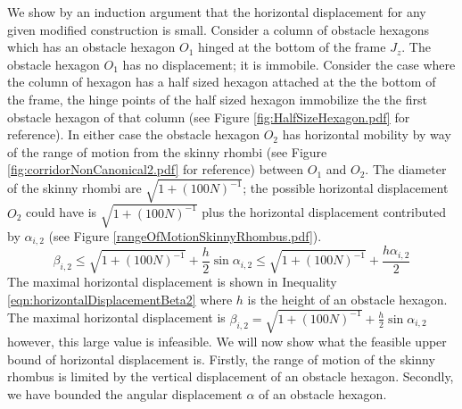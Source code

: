 We show by an induction argument that the horizontal displacement for any given modified construction is small.  
Consider a column of obstacle hexagons which has an obstacle hexagon $O_1$ hinged at the bottom of the frame $J_z$.  
The obstacle hexagon $O_1$ has no displacement; it is immobile.  
Consider the case where the column of hexagon has a half sized hexagon attached at the the bottom of the frame, the hinge points of the half sized hexagon immobilize the the first obstacle hexagon of that column (see Figure \ref{fig:HalfSizeHexagon.pdf} for reference).  
In either case the obstacle hexagon $O_2$ has horizontal mobility by way of the range of motion from the skinny rhombi (see Figure \ref{fig:corridorNonCanonical2.pdf} for reference) between $O_1$ and $O_2$. 
The diameter of the skinny rhombi are $\sqrt{1 + (100N)^{-1}}$; the possible horizontal displacement $O_2$ could have is $\sqrt{1 + (100N)^{-1}}$ plus the horizontal displacement contributed by $\alpha_{i,2}$ (see Figure \ref{rangeOfMotionSkinnyRhombus.pdf}).
\begin{equation}\label{eqn:horizontalDisplacementBeta2}
\beta_{i,2} \leq \sqrt{1 + (100N)^{-1}} + \frac{h}{2} \sin \alpha_{i,2} \leq \sqrt{1 + (100N)^{-1}} + \frac{h\alpha_{i,2} }{2}
\end{equation}
The maximal horizontal displacement is shown in Inequality \ref{eqn:horizontalDisplacementBeta2} where $h$ is the height of an obstacle hexagon.  
The maximal horizontal displacement is $\beta_{i,2} = \sqrt{1 + (100N)^{-1}} + \frac{h}{2} \sin \alpha_{i,2}$ however, this large value is infeasible.  
We will now show what the feasible upper bound of horizontal displacement is.
Firstly, the range of motion of the skinny rhombus is limited by the vertical displacement of an obstacle hexagon. 
Secondly, we have bounded the angular displacement $\alpha$ of an obstacle hexagon.  


